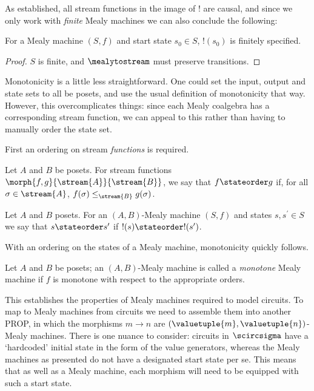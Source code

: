 As established, all stream functions in the image of \(!\) are causal, and since
we only work with \emph{finite} Mealy machines we can also conclude the
following:

\begin{lemma}
    For a Mealy machine \((S, f)\) and start state \(s_0 \in S\), \(!(s_0)\)
    is finitely specified.
\end{lemma}
\begin{proof}
    \(S\) is finite, and \(\mealytostream\) must preserve transitions.
\end{proof}

Monotonicity is a little less straightforward.
One could set the input, output and state sets to all be posets, and use the
usual definition of monotonicity that way.
However, this overcomplicates things: since each Mealy coalgebra has a
corresponding stream function, we can appeal to this rather than having to
manually order the state set.

First an ordering on stream \emph{functions} is required.

\begin{definition}
    Let \(A\) and \(B\) be posets.
    For stream functions \(\morph{f,g}{\stream{A}}{\stream{B}}\), we say that
    \(f \stateorder g\) if, for all \(\sigma \in \stream{A}\),
    \(f(\sigma) \leq_{\stream{B}} g(\sigma)\).
\end{definition}

\begin{definition}
    Let \(A\) and \(B\) posets.
    For an \((A,B)\)-Mealy machine \((S, f)\) and states \(s,s^\prime \in S\)
    we say that \(s \stateorder s^\prime\) if \(!(s) \stateorder !(s^\prime)\).
\end{definition}

With an ordering on the states of a Mealy machine, monotonicity quickly follows.

\begin{definition}
    Let \(A\) and \(B\) be posets; an \((A,B)\)-Mealy machine is called a
    \emph{monotone} Mealy machine if \(f\) is monotone with respect to the
    appropriate orders.
\end{definition}

This establishes the properties of Mealy machines required to model circuits.
To map to Mealy machines from circuits we need to assemble them into another
PROP, in which the morphisms \(m \to n\) are
\((\valuetuple{m},\valuetuple{n})\)-Mealy machines.
There is one nuance to consider: circuits in \(\scircsigma\) have a `hardcoded'
initial state in the form of the value generators, whereas the Mealy machines
as presented do not have a designated start state per se.
This means that as well as a Mealy machine, each morphism will need to be
equipped with such a start state.

